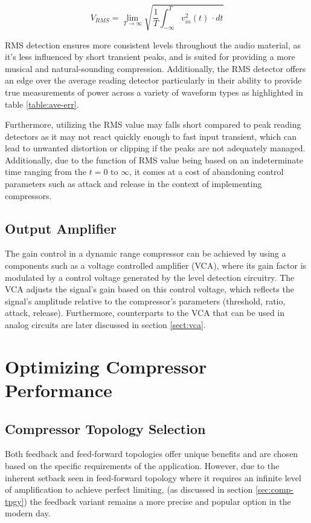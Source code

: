 \documentclass[10pt]{article}
\begin{document}
\begin{multicols*}{2}
                        \begin{equation}
                            V_{RMS} = \lim_{T \to \infty}\sqrt{\frac{1}{T}\int_{-\infty}^{T} v_{in}^2(t) \,\cdot dt}
                        \end{equation}
                    
                    \noindent RMS detection ensures more consistent levels throughout the audio material, as it's less influenced by short transient peaks, and is suited for providing a more musical and natural-sounding compression. Additionally, the RMS detector offers an edge over the average reading detector particularly in their ability to provide true measurements of power across a variety of waveform types as highlighted in table \ref{table:ave-err}.   

                    Furthermore, utilizing the RMS value may falls short compared to peak reading detectors as it may not react quickly enough to fast input transient, which can lead to unwanted distortion or clipping if the peaks are not adequately managed. Additionally, due to the function of RMS value being based on an indeterminate time ranging from the $t=0$ to $\infty$, it comes at a cost of abandoning control parameters such as attack and release in the context of implementing compressors.

            \subsection{Output Amplifier}
                The gain control in a dynamic range compressor can be achieved by using a components such as a voltage controlled amplifier (VCA),  where its gain factor is modulated by a control voltage generated by the level detection circuitry. The VCA adjusts the signal's gain based on this control voltage, which reflects the signal's amplitude relative to the compressor's parameters (threshold, ratio, attack, release). Furthermore, counterparts to the VCA that can be used in analog circuits are later discussed in section \ref{sect:vca}.
        
        \section[Optimizing Compressor Performance]{Optimizing Compressor\\Performance}
            
            \subsection{Compressor Topology Selection}
                Both feedback and feed-forward topologies offer unique benefits and are chosen based on the specific requirements of the application. However, due to the inherent setback seen in feed-forward topology where it requires an infinite level of amplification to achieve perfect limiting, (as discussed in section \ref{sec:comp-tpgy}) the feedback variant remains a more precise and popular option in the modern day.\par


\end{multicols*}
\end{document}
